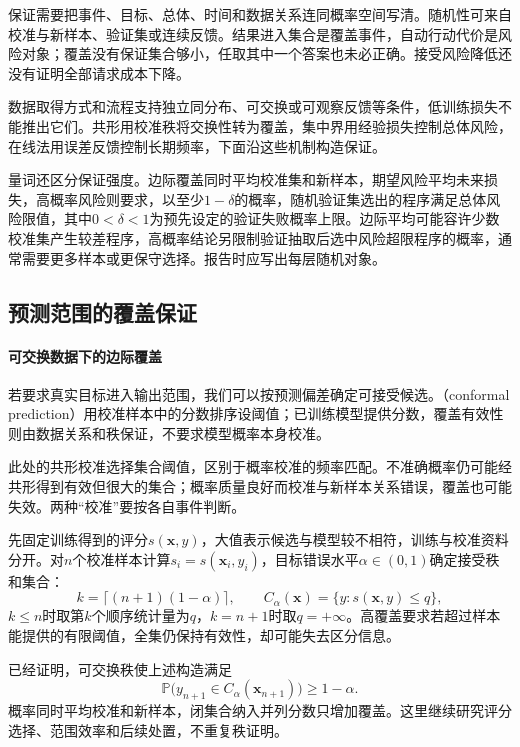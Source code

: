 保证需要把事件、目标、总体、时间和数据关系连同概率空间写清。随机性可来自校准与新样本、验证集或连续反馈。结果进入集合是覆盖事件，自动行动代价是风险对象；覆盖没有保证集合够小，任取其中一个答案也未必正确。接受风险降低还没有证明全部请求成本下降。

数据取得方式和流程支持独立同分布、可交换或可观察反馈等条件，低训练损失不能推出它们。共形用校准秩将交换性转为覆盖，集中界用经验损失控制总体风险，在线法用误差反馈控制长期频率，下面沿这些机制构造保证。

量词还区分保证强度。边际覆盖同时平均校准集和新样本，期望风险平均未来损失，高概率风险则要求，以至少$1-\delta$的概率，随机验证集选出的程序满足总体风险限值，其中$0<\delta<1$为预先设定的验证失败概率上限。边际平均可能容许少数校准集产生较差程序，高概率结论另限制验证抽取后选中风险超限程序的概率，通常需要更多样本或更保守选择。报告时应写出每层随机对象。

\subsection{预测范围的覆盖保证}

\paragraph{可交换数据下的边际覆盖}

若要求真实目标进入输出范围，我们可以按预测偏差确定可接受候选。（conformal prediction）用校准样本中的分数排序设阈值；已训练模型提供分数，覆盖有效性则由数据关系和秩保证，不要求模型概率本身校准。

此处的共形校准选择集合阈值，区别于概率校准的频率匹配。不准确概率仍可能经共形得到有效但很大的集合；概率质量良好而校准与新样本关系错误，覆盖也可能失效。两种“校准”要按各自事件判断。

先固定训练得到的评分$s(\bm{x},y)$，大值表示候选与模型较不相符，训练与校准资料分开。对$n$个校准样本计算$s_i=s(\bm{x}_i,y_i)$，目标错误水平$\alpha\in(0,1)$确定接受秩和集合：
\begin{equation}
 k=\lceil(n+1)(1-\alpha)\rceil,\qquad
 C_\alpha(\bm{x})=\{y:s(\bm{x},y)\leq q\},
 \label{eq:reliability-conformal-set}
\end{equation}
$k\leq n$时取第$k$个顺序统计量为$q$，$k=n+1$时取$q=+\infty$。高覆盖要求若超过样本能提供的有限阈值，全集仍保持有效性，却可能失去区分信息。

已经证明，可交换秩使上述构造满足
\[
 \mathbb P\bigl(y_{n+1}\in C_\alpha(\bm{x}_{n+1})\bigr)
 \geq1-\alpha.
\]
概率同时平均校准和新样本，闭集合纳入并列分数只增加覆盖。这里继续研究评分选择、范围效率和后续处置，不重复秩证明。

